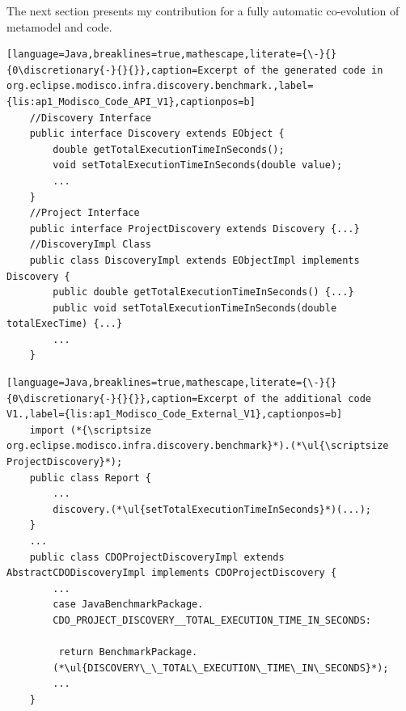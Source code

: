 The next section presents my contribution for a fully automatic co-evolution of metamodel and code.  
\vspace{0.5cm}
\begin{lstlisting}[language=Java,breaklines=true,mathescape,literate={\-}{}{0\discretionary{-}{}{}},caption=Excerpt of the generated code in org.eclipse.modisco.infra.discovery.benchmark.,label={lis:ap1_Modisco_Code_API_V1},captionpos=b]
	//Discovery Interface
	public interface Discovery extends EObject {
		double getTotalExecutionTimeInSeconds();
		void setTotalExecutionTimeInSeconds(double value);
		...
	}
	//Project Interface
	public interface ProjectDiscovery extends Discovery {...}
	//DiscoveryImpl Class
	public class DiscoveryImpl extends EObjectImpl implements Discovery {
		public double getTotalExecutionTimeInSeconds() {...}
		public void setTotalExecutionTimeInSeconds(double totalExecTime) {...}
		...
	}
\end{lstlisting}
\begin{lstlisting}[language=Java,breaklines=true,mathescape,literate={\-}{}{0\discretionary{-}{}{}},caption=Excerpt of the additional code V1.,label={lis:ap1_Modisco_Code_External_V1},captionpos=b]
	import (*{\scriptsize org.eclipse.modisco.infra.discovery.benchmark}*).(*\ul{\scriptsize ProjectDiscovery}*);
	public class Report {
		...
		discovery.(*\ul{setTotalExecutionTimeInSeconds}*)(...);
	}
	...
	public class CDOProjectDiscoveryImpl extends AbstractCDODiscoveryImpl implements CDOProjectDiscovery {
		...
		case JavaBenchmarkPackage.
		CDO_PROJECT_DISCOVERY__TOTAL_EXECUTION_TIME_IN_SECONDS:
		
		 return BenchmarkPackage.
		(*\ul{DISCOVERY\_\_TOTAL\_EXECUTION\_TIME\_IN\_SECONDS}*);
		...
	}
	
	
\end{lstlisting}

